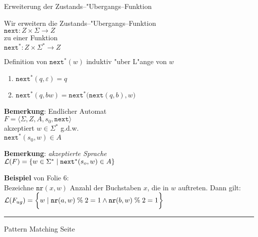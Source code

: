 \begin{slide}{}
\normalsize

\begin{center}
Erweiterung der Zustands--"Ubergangs--Funktion
\end{center}
\vspace*{0.5cm}

\footnotesize
Wir erweitern die Zustands--"Ubergangs--Funktion \\[0.3cm]
\hspace*{1.3cm} $\mathtt{next}: Z \times \Sigma \rightarrow Z$ \\[0.3cm]
zu einer Funktion \\[0.3cm]
\hspace*{1.3cm} $\mathtt{next}^*: Z \times \Sigma^* \rightarrow Z$ 

Definition von $\mathtt{next}^*(w)$ induktiv "uber L"ange von $w$
\begin{enumerate}
\item $\mathtt{next}^*(q,\varepsilon) = q$
\item $\mathtt{next}^*(q,bw) = \mathtt{next}^*\bigg(\mathtt{next}(q,b),w\bigg)$
\end{enumerate}

\textbf{Bemerkung}: Endlicher Automat \\[0.3cm]
\hspace*{1.3cm} $F = \langle \Sigma, Z, A, s_0, \mathtt{next}  \rangle$ \\[0.3cm]
akzeptiert $w \in \Sigma^*$ g.d.w. \\[0.3cm]
\hspace*{1.3cm} $\mathtt{next}^*(s_0,w) \in A$

\textbf{Bemerkung}: \emph{akzeptierte Sprache}\\[0.3cm]
\hspace*{1.3cm}  ${\cal L}(F) = \{ w \in \Sigma^* \;|\; \mathtt{next}^*(s_o,w) \in A \}$

\textbf{Beispiel} von Folie 6: \\[0.3cm]
Bezeichne $\mathtt{nr}(x,w)$ Anzahl der Buchstaben $x$, die in $w$ auftreten. 
Dann gilt: \\[0.3cm]
\hspace*{1.3cm}  ${\cal L}(F_{ug}) = \bigg\{ w  \;|\; \mathtt{nr}(a,w) \;\%\; 2 = 1 \wedge \mathtt{nr}(b,w) \;\%\; 2 = 1 \bigg\}$

\vspace*{\fill}
\tiny \addtocounter{mypage}{1}
\rule{17cm}{1mm}
Pattern Matching \hspace*{\fill} Seite 
\end{slide}

